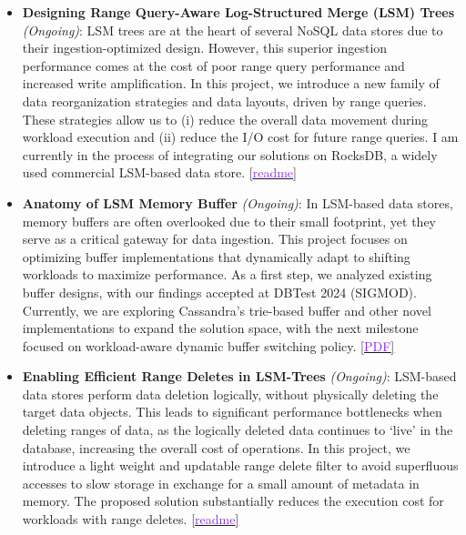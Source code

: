 \begin{itemize}\setlength\itemsep{0.3em}
  \item \textbf{Designing Range Query-Aware Log-Structured Merge (LSM) Trees} \textit{(Ongoing)}: LSM trees are at 
  the heart of several NoSQL data stores due to their ingestion-optimized design. However, this superior ingestion 
  performance comes at the cost of poor range query performance and increased write amplification. In this project, we 
  introduce a new family of data reorganization strategies and data layouts, driven by range queries. These strategies allow us to (i) 
  reduce the overall data movement during workload execution and (ii) reduce the I/O cost for future range queries. I am
  currently in the process of integrating our solutions on RocksDB, a widely used commercial LSM-based data store.
  \href{https://shubhamkaushik.com/projects/designing_range_query_aware_log_structured_merge_tree/}{[\textcolor{blueviolet}{readme}]}

  \item \textbf{Anatomy of LSM Memory Buffer} \textit{(Ongoing)}: In LSM-based data stores, memory buffers are often overlooked 
  due to their small footprint, yet they serve as a critical gateway for data ingestion. This project focuses on optimizing 
  buffer implementations that dynamically adapt to shifting workloads to maximize performance. As a first step, we analyzed 
  existing buffer designs, with our findings accepted at DBTest 2024 (SIGMOD). Currently, we are exploring Cassandra’s trie-based 
  buffer and other novel implementations to expand the solution space, with the next milestone focused on workload-aware dynamic buffer switching policy.
  \href{https://shubhamkaushik.com/assets/pdf/LSMMemory.pdf}{[\textcolor{blueviolet}{PDF}]}

  \item \textbf{Enabling Efficient Range Deletes in LSM-Trees} \textit{(Ongoing)}: LSM-based data stores perform 
  data deletion logically, without physically deleting the target data objects. This leads to significant performance 
  bottlenecks when deleting ranges of data, as the logically deleted data continues to `live' in the database, 
  increasing the overall cost of operations. In this project, we introduce a light weight and updatable range delete filter to avoid 
  superfluous accesses to slow storage in exchange for a small amount of metadata in memory. The proposed solution 
  substantially reduces the execution cost for workloads with range deletes.
  \href{https://shubhamkaushik.com/projects/enabling_efficient_range_deletes_in_lsm_trees/}{[\textcolor{blueviolet}{readme}]}



\end{itemize}
